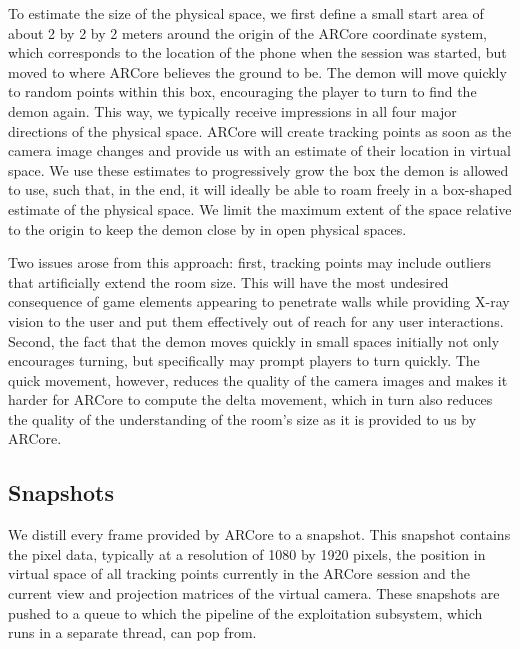 To estimate the size of the physical space, we first define a small start area of about 2 by 2 by 2 meters around the origin of the ARCore coordinate system, which corresponds to the location of the phone when the session was started, but moved to where ARCore believes the ground to be.
The demon will move quickly to random points within this box, encouraging the player to turn to find the demon again.
This way, we typically receive impressions in all four major directions of the physical space.
ARCore will create tracking points as soon as the camera image changes and provide us with an estimate of their location in virtual space.
We use these estimates to progressively grow the box the demon is allowed to use, such that, in the end, it will ideally be able to roam freely in a box-shaped estimate of the physical space.
We limit the maximum extent of the space relative to the origin to keep the demon close by in open physical spaces.

Two issues arose from this approach: first, tracking points may include outliers that artificially extend the room size.
This will have the most undesired consequence of game elements appearing to penetrate walls while providing X-ray vision to the user and put them effectively out of reach for any user interactions.
Second, the fact that the demon moves quickly in small spaces initially not only encourages turning, but specifically may prompt players to turn quickly.
The quick movement, however, reduces the quality of the camera images and makes it harder for ARCore to compute the delta movement, which in turn also reduces the quality of the understanding of the room's size as it is provided to us by ARCore.

\subsection{Snapshots}
We distill every frame provided by ARCore to a snapshot.
This snapshot contains the pixel data, typically at a resolution of 1080 by 1920 pixels, the position in virtual space of all tracking points currently in the ARCore session and the current view and projection matrices of the virtual camera.
These snapshots are pushed to a queue to which the pipeline of the exploitation subsystem, which runs in a separate thread, can pop from.

